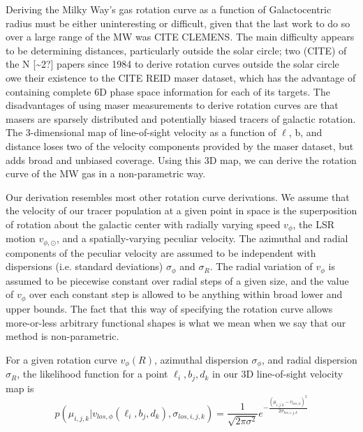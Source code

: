 Deriving the Milky Way's gas rotation curve as a function of Galactocentric radius must be either uninteresting or difficult, given that the last work to do so over a large range of the MW was CITE CLEMENS. The main difficulty appears to be determining distances, particularly outside the solar circle; two (CITE) of the N [\sim 2?] papers since 1984 to derive rotation curves outside the solar circle owe their existence to the CITE REID maser dataset, which has the advantage of containing complete 6D phase space information for each of its targets. The disadvantages of using maser measurements to derive rotation curves are that masers are sparsely distributed and potentially biased tracers of galactic rotation. The 3-dimensional map of line-of-sight velocity as a function of $\ell$, b, and distance loses two of the velocity components provided by the maser dataset, but adds broad and unbiased coverage. Using this 3D map, we can derive the rotation curve of the MW gas in a non-parametric way.

Our derivation resembles most other rotation curve derivations. We assume that the velocity of our tracer population at a given point in space is the superposition of rotation about the galactic center with radially varying speed $v_\phi$, the LSR motion $v_{\phi, \odot}$, and a spatially-varying peculiar velocity. The azimuthal and radial components of the peculiar velocity are assumed to be independent with dispersions (i.e. standard deviations) $\sigma_\phi$ and $\sigma_R$. The radial variation of $v_\phi$ is assumed to be piecewise constant over radial steps of a given size, and the value of $v_\phi$ over each constant step is allowed to be anything within broad lower and upper bounds. The fact that this way of specifying the rotation curve allows more-or-less arbitrary functional shapes is what we mean when we say that our method is non-parametric.

For a given rotation curve $v_\phi(R)$, azimuthal dispersion $\sigma_\phi$, and radial dispersion $\sigma_R$, the likelihood function for a point $\ell_i,b_j,d_k$ in our 3D line-of-sight velocity map is 
\begin{equation}
\label{eqn:rotcurve_likelihood}
p(\mu_{i,j,k} \vert v_{los, \phi}(\ell_i, b_j, d_k), \sigma_{los, i, j, k}) = \frac{1}{\sqrt{2 \pi \sigma^2}} e^{- \frac{(\mu_{i,j,k} - v_{los, \phi})^2}{2 \sigma_{los, i, j ,k}}}
\end{equation}

